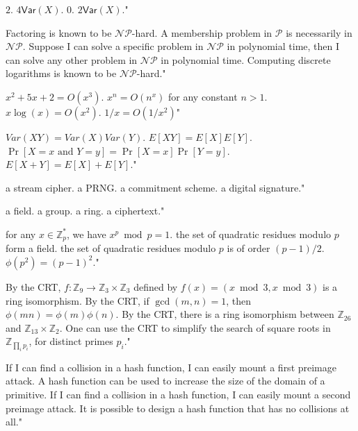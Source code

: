 {$2$.}
{$4\textsf{Var}(X)$.}
{$0$.}
{$2\textsf{Var}(X)$."}

{Factoring is known to be $\mathcal{NP}$-hard.}
{A membership problem in $\mathcal{P}$ is necessarily in $\mathcal{NP}$.}
{Suppose I can solve a specific problem in $\mathcal{NP}$ in polynomial time, then I can solve any other problem in $\mathcal{NP}$ in polynomial time.}
{Computing discrete logarithms is known to be $\mathcal{NP}$-hard."}

{$x^2+5x+2 = O(x^3)$.}
{$x^n = O(n^x)$ for any constant $n > 1$.}
{$x\log(x) = O(x^2)$.}
{$1/x = O(1/x^2)$"}

{$Var(XY) = Var(X)Var(Y)$.}
{$E[XY] = E[X]E[Y]$.}
{$\Pr[X=x\text{ and } Y = y] = \Pr[X=x]\Pr[Y=y]$.}
{$E[X+Y] = E[X] + E[Y]$."}

{a stream cipher.}
{a PRNG.}
{a commitment scheme.}
{a digital signature."}

{a field.}
{a group.}
{a ring.}
{a ciphertext."}

{for any $x \in \mathbb{Z}_p^*$, we have $x^p \bmod{p} = 1$.}
{the set of quadratic residues modulo $p$ form a field.}
{the set of quadratic residues modulo $p$ is of order $(p-1)/2$.}
{$\phi(p^2) = (p-1)^2$."}

{By the CRT, $f: \mathbb{Z}_9 \rightarrow \mathbb{Z}_3\times \mathbb{Z}_3$ defined by $f(x) = (x\bmod{3}, x\bmod{3})$ is a ring isomorphism.}
{By the CRT, if $\gcd(m,n) = 1$, then $\phi(mn) = \phi(m)\phi(n)$.}
{By the CRT, there is a ring isomorphism between $\mathbb{Z}_{26}$ and $\mathbb{Z}_{13}\times \mathbb{Z}_2$.}
{One can use the CRT to simplify the search of square roots in $\mathbb{Z}_{\prod_i p_i}$, for distinct primes $p_i$."}

{If I can find a collision in a hash function, I can easily mount a first preimage attack.}
{A hash function can be used to increase the size of the domain of a primitive.}
{If I can find a collision in a hash function, I can easily mount a second preimage attack.}
{It is possible to design a hash function that has no collisions at all."}

